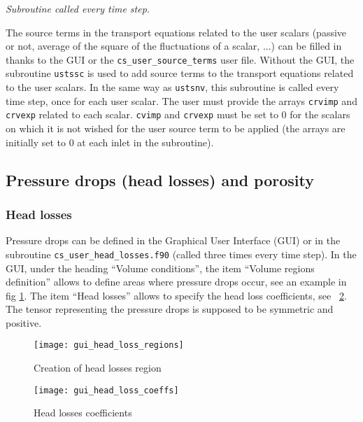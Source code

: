 {{{\noindent
\textit{Subroutine called every time step.}

The source terms in the transport equations related to the user scalars
(passive or not, average of the square of the fluctuations of a scalar, ...)
can be filled in thanks to the GUI or the \texttt{cs\_user\_source\_terms} user file.
Without the GUI, the subroutine \texttt{ustssc} is used to add source terms to the
transport equations related to the user scalars. In the same way as
\texttt{ustsnv}, this subroutine is called every time step, once for
each user scalar. The user must provide the arrays \texttt{crvimp}
and \texttt{crvexp} related to each scalar. \texttt{cvimp} and \texttt{crvexp}
must be set to 0 for the scalars on which it is not wished for the user source
term to be applied (the arrays are initially set to 0 at each inlet in the subroutine).

\subsection{Pressure drops (head losses) and porosity}
\label{sec:prg_headlosses}

\subsubsection{Head losses}

Pressure drops can be defined in the Graphical User Interface (GUI) or in the subroutine \texttt{cs\_user\_head\_losses.f90} (called three times every time step). In the GUI, under the heading ``Volume conditions'', the item ``Volume regions definition'' allows to define areas where pressure drops occur, see an example in fig \ref{fig:hl1}. The item ``Head losses'' allows to specify the head loss coefficients, see \figurename~\ref{fig:hl2}. The tensor representing the pressure drops is supposed to be symmetric
and positive.

\begin{figure}[!ht]
\begin{center}
\texttt{[image: gui\_head\_loss\_regions]}
\caption{Creation of head losses region}
\label{fig:hl1}
\end{center}
\end{figure}
%
\begin{figure}[!ht]
\begin{center}
\texttt{[image: gui\_head\_loss\_coeffs]}
\caption{Head losses coefficients}
\label{fig:hl2}
\end{center}
\end{figure}

}}}
